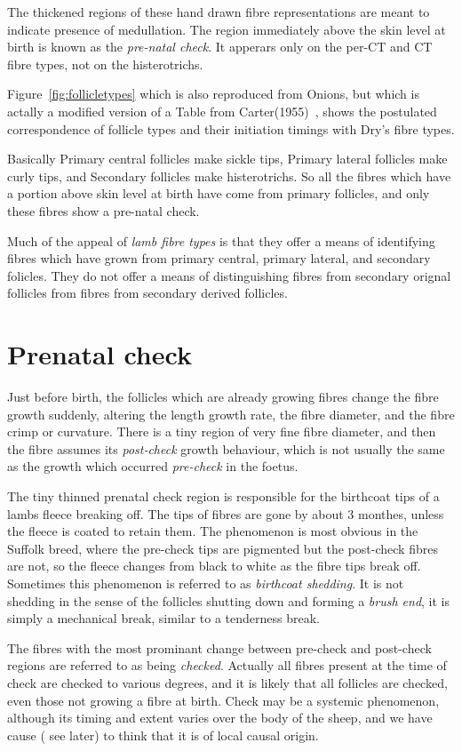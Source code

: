 \documentclass[titlepage]{article}  %
\begin{document}
The thickened regions of these hand drawn fibre representations are meant to indicate presence of medullation. The region immediately above the skin level at birth is known as the {\em pre-natal check}. It apperars only on the per-CT and CT fibre types, not on the histerotrichs.

Figure~\ref{fig:follicletypes} which is also reproduced from Onions, but which is  actally  a modified version of a Table from Carter(1955)~\cite{cart:55}, shows the postulated correspondence of follicle types and their initiation timings with Dry's fibre types.

Basically Primary central follicles make sickle tips, Primary lateral follicles make curly tips, and Secondary follicles make histerotrichs. So all the fibres which have a portion above skin level at birth have come from primary follicles, and only these fibres show a pre-natal check.

Much of the appeal of {\em lamb fibre types} is that they offer a means of identifying fibres which have grown from primary central, primary lateral, and secondary folicles. They do not offer a means of distinguishing fibres from secondary orignal follicles from fibres from secondary derived follicles. 

\section{Prenatal check}
Just before birth, the follicles which are already growing fibres change the fibre growth suddenly, altering the length growth rate, the fibre diameter, and the fibre crimp or curvature. There is a tiny region of very fine fibre diameter, and then the fibre assumes its {\em post-check} growth behaviour, which is not usually the same as the growth which occurred {\em pre-check} in the foetus.

The tiny thinned prenatal check region is responsible for the birthcoat tips of a lambs fleece breaking off. The tips of fibres are gone by about 3 monthes, unless the fleece is coated to retain them.  The phenomenon is most obvious in the Suffolk breed,  where the pre-check tips are pigmented but the post-check fibres are not, so the fleece changes from black to white as the fibre tips break off. Sometimes this phenomenon is referred to as {\em birthcoat shedding}. It is not shedding in the sense of the follicles shutting down and forming a {\em brush end}, it is simply a mechanical break, similar to a tenderness break. 

The fibres with the most prominant change between pre-check and post-check regions are referred to as being {\em checked}. Actually all fibres present at the time of check are checked to various degrees, and it is likely that all follicles are checked, even those not growing a fibre at birth.  Check may  be a systemic phenomenon, although its timing and extent varies over the body of the sheep, and we have cause ( see later) to think that it is of local causal origin.
\end{document}
